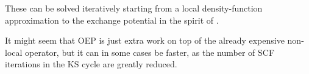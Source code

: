 \documentclass[a4paper]{article}
\begin{document}
These can be solved iteratively starting from a local density-function
approximation to the exchange potential in the spirit of
\cite{Kummel2003}.

It might seem that OEP is just extra work on top of the already
expensive non-local operator, but it can in some cases be faster, as
the number of SCF iterations in the KS cycle are greatly reduced.

\clearpage
{}


\end{document}
